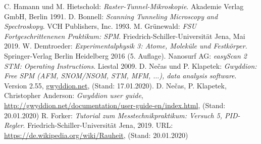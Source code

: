 \documentclass[a4paper,twoside,final]{article}
\begin{document}

\begin{thebibliography}{xxx}
C. Hamann und M. Hietschold: \textit{Raster-Tunnel-Mikroskopie}. Akademie Verlag GmbH, Berlin 1991.
D. Bonnell: \textit{Scanning Tunneling Microscopy and Spectroskopy}. VCH Publishers, Inc. 1993.
M. Grünewald: \textit{FSU Fortgeschrittenenen Praktikum: SPM}. Fried\-rich-Schil\-ler-Uni\-versi\-tät Jena, Mai 2019.
W. Demtroeder: \textit{Experimentalphysik 3: Atome, Moleküle und Festkörper}. Springer-Verlag Berlin Heidelberg 2016 (5. Auflage).
Nanosurf AG: \textit{easyScan 2 STM: Operating Instructions}. Liestal 2009.
D. Nečas und P. Klapetek: \textit{Gwyddion: Free SPM (AFM, SNOM/NSOM, STM, MFM, $\hdots$), data analysis software}. Version 2.55, \url{gwyddion.net}, (Stand: 17.01.2020).
D. Nečas, P. Klapetek, Christopher Anderson: \textit{Gwyddion user guide}, \url{http://gwyddion.net/documentation/user-guide-en/index.html}, (Stand: 20.01.2020)
R. Forker: \textit{Tutorial zum Messtechnikpraktikum: Versuch 5, PID-Regler}. Fried\-rich-Schil\-ler-Uni\-versi\-tät Jena, 2019.
URL: \url{https://de.wikipedia.org/wiki/Rauheit}, (Stand: 20.01.2020)
\end{thebibliography}
\end{document}
